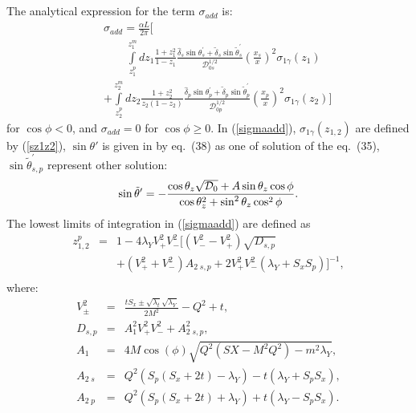 \documentclass[aps,prd,reprint,groupedaddress,preprintnumbers,showpacs]{revtex4-1}
\begin{document}
\appendix
\section{\label{sadd}} 
The analytical expression for the term $\sigma_{add}$ is:
\begin{eqnarray}\label{sigmaadd}
&&\sigma_{add}=
\frac{\alpha L}{2\pi}\Biggl[
\\
&&\qquad
\int\limits_{z_1^p}^{z_1^m}dz_1\frac{1+z_1^2}{1-z_1}
\frac{
{\hat \delta}_s\sin\theta^\prime_s+\tilde \delta_s\sin\tilde \theta^\prime_s
}{{\mathcal D}_{0s}^{1/2}}\left(\frac{x_s}{x} \right)^2\sigma_{1\gamma }(z_1)
\nonumber
\\&&
+
\int\limits_{z_2^p}^{z_2^m}dz_2\frac{1+z_2^2}{z_2(1-z_2)}
\frac{{\hat \delta}_p\sin\theta^\prime_p+\tilde\delta_p\sin\tilde \theta^\prime_p}{{\mathcal D}_{0p}^{1/2}}\left(\frac{x_p}{x} \right)^2\sigma_{1\gamma }(z_2)
\Biggr]
\nonumber
\end{eqnarray}
for $\cos \phi<0$, and $\sigma_{add}=0$ for $\cos \phi\ge0$. In (\ref{sigmaadd}), 
$\sigma_{1\gamma }(z_{1,2})$ are defined  by (\ref{sz1z2}), 
 $\sin\theta '$ is given in \cite{AkushevichIlyichev2012} by eq.~(38) as one of  solution of the eq.~(35),
$\sin{\tilde \theta}^\prime_{s,p}$ represent other solution:
\begin{eqnarray}
\sin{\tilde \theta}^\prime=-\frac{\cos\theta _z\sqrt{{\cal D}_0}+A\sin\theta_z\cos\phi}{\cos\theta_z^2+\sin^2\theta_z\cos^2\phi}.
\end{eqnarray}
The lowest limits of integration in (\ref{sigmaadd}) are defined as
\begin{eqnarray}
z^p_{1,2}&=&1-4\lambda_YV^2_+V^2_-[(V^2_--V^2_+)\sqrt{D_{s,p}}
\nonumber\\&&
+(V^2_++V^2_-)A_{2\; s,p}
+2V^2_+V^2_-(\lambda_Y+S_xS_p)]^{-1},
\nonumber\\&&
\end{eqnarray}
where:
\begin{eqnarray}
V^2_{\pm}&=&\frac{t S_x\pm\sqrt{\lambda_t}\sqrt{\lambda_Y}}{2M^2}-Q^2+t,
\nonumber\\
D_{s,p}&=&A_1^2V^2_+V^2_-+A_{2\; s,p}^2,
\nonumber\\
A_1&=&4M\cos(\phi)\sqrt{Q^2(S X-M^2Q^2)-m^2\lambda_Y},
\nonumber\\
A_{2\; s}&=&Q^2(S_p(S_x+2t)-\lambda_Y)-t(\lambda_Y+S_pS_x),
\nonumber\\
A_{2\; p}&=&Q^2(S_p(S_x+2t)+\lambda_Y)+t(\lambda_Y-S_pS_x).
\label{ad12}
\end{eqnarray}
\end{document}
